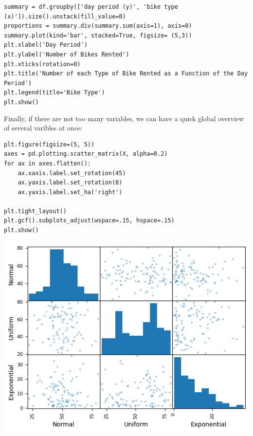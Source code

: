 \documentclass[24pt]{article}
\begin{document}
\begin{lstlisting}
summary = df.groupby(['day period (y)', 'bike type (x)']).size().unstack(fill_value=0)
proportions = summary.div(summary.sum(axis=1), axis=0)
summary.plot(kind='bar', stacked=True, figsize= (5,3))
plt.xlabel('Day Period')
plt.ylabel('Number of Bikes Rented')
plt.xticks(rotation=0)
plt.title('Number of each Type of Bike Rented as a Function of the Day Period')
plt.legend(title='Bike Type')
plt.show()
\end{lstlisting}



Finally, if there are not too many variables, we can have a quick global overview of several varibles at once:

\begin{lstlisting}
plt.figure(figsize=(5, 5))
axes = pd.plotting.scatter_matrix(X, alpha=0.2)
for ax in axes.flatten():
    ax.xaxis.label.set_rotation(45)
    ax.yaxis.label.set_rotation(0)
    ax.yaxis.label.set_ha('right')

plt.tight_layout()
plt.gcf().subplots_adjust(wspace=.15, hspace=.15)
plt.show()
\end{lstlisting}

\begin{center}
\includegraphics[scale = 0.5]{scatter_matrix.png}
\end{center}
\end{document}
